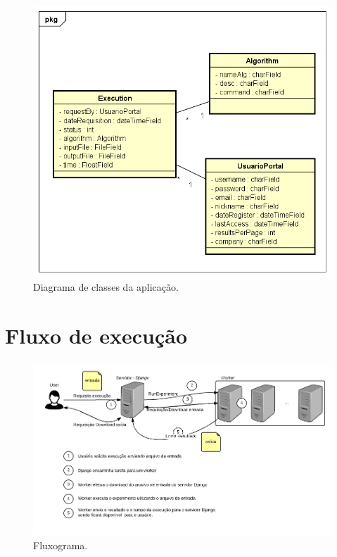 \documentclass[tg]{mdtufsm}
\begin{document}
\begin{figure}
	\centering
	\includegraphics[width=1\textwidth]{class_diagran_tg}
	\caption{
		Diagrama de classes da aplicação.
	}
	\label{fig:classdiagram}
\end{figure}

\section{Fluxo de execução}

\begin{figure}
	\centering
	\includegraphics[width=1\textwidth]{diagrama2}
	\caption{
		Fluxograma.
	}
	\label{fig:diagrama}
\end{figure}
\end{document}
